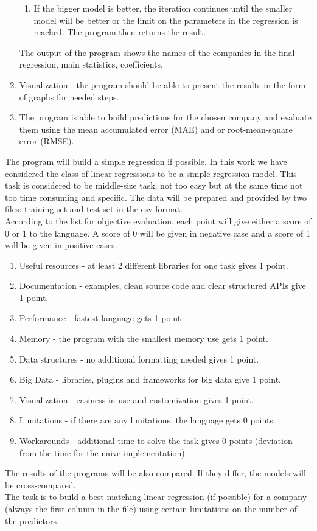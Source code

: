 \documentclass [twoside,
  11pt, a4paper,
  footinclude=true,
  headinclude=true,
  cleardoublepage=empty
]{article}
\begin{document}
\begin{enumerate}
\begin{enumerate}
        \item If the bigger model is better, the iteration continues until the smaller model will be better or the limit on the parameters in the regression is reached. The program then returns the result. 
    \end{enumerate}
The output of the program shows the names of the companies in the final regression, main statistics, coefficients.
    \item Visualization - the program should be able to present the results in the form of graphs for needed steps.
    \item The program is able to build predictions for the chosen company and evaluate them using the mean accumulated error (MAE) and or root-mean-square error (RMSE).
\end{enumerate}
The program will build a simple regression if possible. In this work we have considered the class of linear regressions to be a simple regression model. This task is considered to be middle-size task, not too easy but at the same time not too time consuming and specific.
The data will be prepared and provided by two files: training set and test set in the csv format.\\
According to the list for objective evaluation, each point will give either a score of 0 or 1 to the language. A score of 0 will be given in negative case and a score of 1 will be given in positive cases.
\begin{enumerate}
    \item[] Useful resources - at least 2 different libraries for one task gives 1 point.
    \item[] Documentation - examples, clean source code and clear structured APIs give 1 point.
    \item[] Performance - fastest language gets 1 point
    \item[] Memory - the program with the smallest memory use gets 1 point.
    \item[] Data structures - no additional formatting needed gives 1 point.
    \item[] Big Data - libraries, plugins and frameworks for big data give 1 point.
    \item[] Visualization - easiness in use and customization gives 1 point.
    \item[] Limitations - if there are any limitations, the language gets 0 points.
    \item[] Workarounds - additional time to solve the task gives 0 points (deviation from the time for the naive implementation).
\end{enumerate}
The results of the programs will be also compared. If they differ, the models will be cross-compared.\\
The task is to build a best matching linear regression (if possible) for a company (always the first column in the file) using certain limitations on the number of the predictors.
\end{document}
